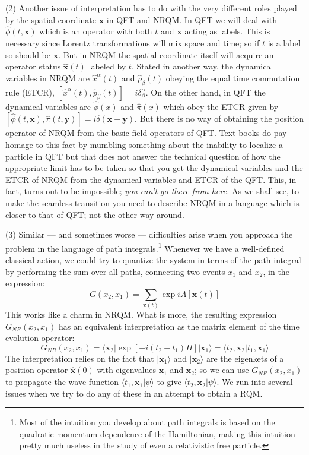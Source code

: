 \documentclass[12pt]{article}
\def\ket#1{|#1\rangle}                    %
\def\bk#1#2#3{{\langle #1|#2|#3\rangle}}  %
\def\amp#1#2{\langle #1 | #2\rangle}      %
\begin{document}
 (2) Another issue of interpretation has to do with the very different roles played by the spatial coordinate $\bm{x}$ in QFT and NRQM. In QFT we will deal with $\hat \phi (t,\bm{x})$ which is an operator with both $t$ and $\bm{x}$ acting as labels. This is necessary since Lorentz transformations will mix space and time; so if $t$ is a label so should be $\bm{x}$. But in NRQM the spatial coordinate itself will acquire an operator status $\hat{\bm{x}}(t)$ labeled by $t$. Stated in another way, the dynamical variables
 in NRQM
 are $\hat{x}^\alpha(t)$ and $\hat{p}_\beta(t)$ obeying the equal time commutation rule (ETCR), $[\hat{x}^\alpha(t),\hat{p}_\beta(t)]= i \delta^\alpha_\beta$. On the other hand, in QFT the dynamical variables are $\hat{\phi}(x)$ and $\hat{\pi}(x)$ which obey the ETCR given by $[\hat{\phi}(t,\bm{x}), \hat{\pi}(t,\bm{y})] = i\delta (\bm{x-y})$. But there is no way of obtaining the position operator of NRQM from the basic field operators of QFT. Text books do pay homage to this fact by mumbling something about the inability to localize a particle in QFT but that does not answer the technical question of how the appropriate limit has to be taken so that you get the dynamical variables and the ETCR of NRQM from the dynamical variables and ETCR of the QFT. This, in fact, turns out to be impossible; \textit{you can't go there from here.} As we shall see, to make the seamless transition you need to describe  NRQM in a language which is closer to that of QFT; not the other way around.
 
 (3) Similar --- and sometimes worse --- difficulties arise when you approach the problem in the language of path integrals.\footnote{Most of the intuition you develop about path integrals is based on the quadratic momentum dependence of the Hamiltonian, making this intuition pretty much useless in the study of even a relativistic free  particle.} 
 Whenever we have a well-defined classical action,  we could try to  quantize the system in terms of the path integral by performing the sum over all paths, connecting two events $x_1$ and $x_2$, in the expression:
\begin{equation}
 G(x_2,x_1)=\sum_{\bm{x}(t)}\exp iA[\bm{x}(t)]
 \label{gassum}
\end{equation}
This works like a charm in NRQM. What is more, the resulting expression $G_{NR}(x_2,x_1)$  has an equivalent interpretation  as the matrix element of the time evolution operator:
\begin{equation}
 G_{NR}(x_2,x_1)=\bk{\bm{x}_2}{\exp[-i(t_2-t_1)H]}{\bm{x}_1}=\amp{t_2,\bm{x}_2}{t_1,\bm{x}_1}
 \label{gasme}
\end{equation}
The interpretation  relies on the fact that $\ket{\bm{x}_1}$ and $\ket{\bm{x}_2}$ are the eigenkets of a position operator $\hat{\bm{x}}(0)$ with eigenvalues $\bm{x}_1$ and $\bm{x}_2$; so we can use $G_{NR}(x_2,x_1)$ to propagate the wave function $\amp{t_1,\bm{x}_1}{\psi}$ to give
$\amp{t_2,\bm{x}_2}{\psi}$. We run into several issues when we try to do any of these in an attempt to obtain a RQM.
\end{document}
